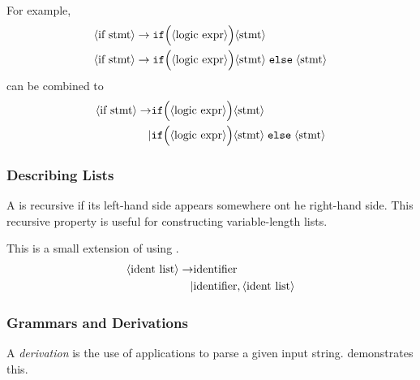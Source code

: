 For example,
\begin{equation}\label{eq:Multiple_Productions_Multiple_Lines}
  \begin{aligned}
    \langle \text{if stmt} \rangle &\rightarrow \mathtt{if} \Bigl( \langle \text{logic expr} \rangle \Bigr) \langle \text{stmt} \rangle \\
    \langle \text{if stmt} \rangle &\rightarrow \mathtt{if} \Bigl( \langle \text{logic expr} \rangle \Bigr) \langle \text{stmt} \rangle \; \mathtt{else} \; \langle \text{stmt} \rangle \\
  \end{aligned}
\end{equation}
can be combined to
\begin{equation}\label{eq:Multiple_Productions_One_Line}
  \begin{aligned}
    \langle \text{if stmt} \rangle \rightarrow &\mathtt{if} \Bigl( \langle \text{logic expr} \rangle \Bigr) \langle \text{stmt} \rangle \\
    \vert &\mathtt{if} \Bigl( \langle \text{logic expr} \rangle \Bigr) \langle \text{stmt} \rangle \; \mathtt{else} \; \langle \text{stmt} \rangle
  \end{aligned}
\end{equation}

\subsubsection{Describing Lists}\label{subsubsec:Describing_Lists}
A  is recursive if its left-hand side  appears somewhere ont he right-hand side.
This recursive property is useful for constructing variable-length lists.

This is a small extension of using .
\begin{equation}\label{eq:Describing_Lists}
  \begin{aligned}
    \langle \text{ident list} \rangle \rightarrow &\text{identifier} \\
    \vert &\text{identifier}, \langle \text{ident list} \rangle \\
  \end{aligned}
\end{equation}

\subsubsection{Grammars and Derivations}\label{subsubsec:Grammars_and_Derivations}
\begin{definition}[Derivation]\label{def:Derivation}
  A \emph{derivation} is the use of  applications to parse a given input string.
   demonstrates this.
\end{definition}

